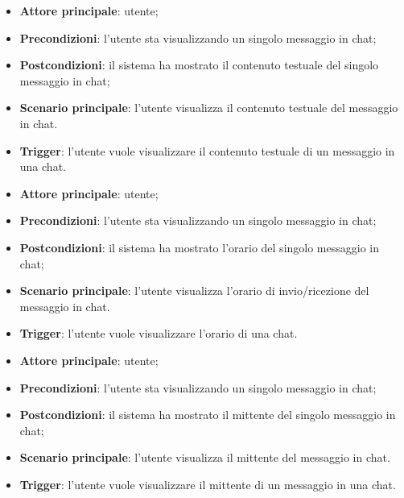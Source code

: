 \documentclass[10pt, a4paper]{article}
\begin{document}
    \begin{itemize}
        \item \textbf{Attore principale}: utente;
        \item \textbf{Precondizioni}: l’utente sta visualizzando un singolo messaggio in chat;
        \item \textbf{Postcondizioni}: il sistema ha mostrato il contenuto testuale del singolo messaggio in chat;
        \item \textbf{Scenario principale}: l’utente visualizza il contenuto testuale del messaggio in chat.
        \item \textbf{Trigger}: l’utente vuole visualizzare il contenuto testuale di un messaggio in una chat.
    \end{itemize}

    \begin{itemize}
        \item \textbf{Attore principale}: utente;
        \item \textbf{Precondizioni}: l’utente sta visualizzando un singolo messaggio in chat;
        \item \textbf{Postcondizioni}: il sistema ha mostrato l'orario del singolo messaggio in chat;
        \item \textbf{Scenario principale}: l’utente visualizza l'orario di invio/ricezione del messaggio in chat.
        \item \textbf{Trigger}: l’utente vuole visualizzare l'orario di una chat.
    \end{itemize}

    \begin{itemize}
        \item \textbf{Attore principale}: utente;
        \item \textbf{Precondizioni}: l’utente sta visualizzando un singolo messaggio in chat;
        \item \textbf{Postcondizioni}: il sistema ha mostrato il mittente del singolo messaggio in chat;
        \item \textbf{Scenario principale}: l’utente visualizza il mittente del messaggio in chat.
        \item \textbf{Trigger}: l’utente vuole visualizzare il mittente di un messaggio in una chat.
    \end{itemize}
\end{document}
